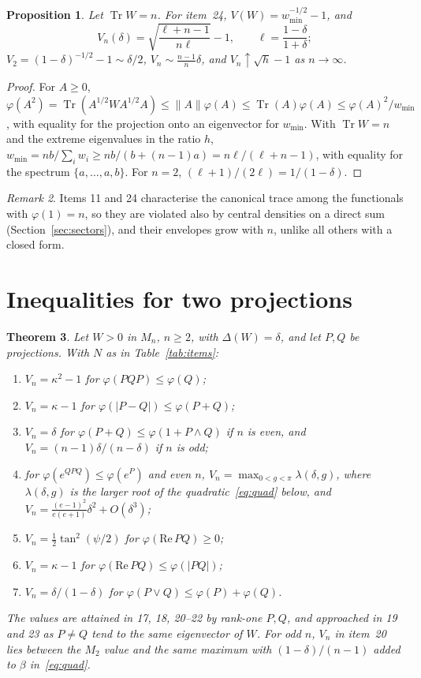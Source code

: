 \documentclass[11pt]{article}
\DeclareMathOperator{\Tr}{Tr}
\renewcommand{\Re}{\mathrm{Re}\,}
\theoremstyle{plain}
\newtheorem{theorem}{Theorem}[section]
\newtheorem{proposition}[theorem]{Proposition}
\theoremstyle{definition}
\theoremstyle{remark}
\newtheorem{remark}[theorem]{Remark}
\begin{document}
\begin{proposition}\label{prop:power}
Let $\Tr W=n$. For item~24, $V(W)=w_{\min}^{-1/2}-1$, and
\[
  V_n(\delta)=\sqrt{\frac{\ell+n-1}{n\ell}}-1,\qquad\ell=\frac{1-\delta}{1+\delta};
\]
$V_2=(1-\delta)^{-1/2}-1\sim\delta/2$, $V_n\sim\frac{n-1}n\delta$, and $V_n\uparrow\sqrt h-1$ as $n\to\infty$.
\end{proposition}
\begin{proof}
For $A\ge0$, $\varphi(A^2)=\Tr(A^{1/2}WA^{1/2}A)\le\|A\|\varphi(A)\le\Tr(A)\varphi(A)\le\varphi(A)^2/w_{\min}$, with equality for
the projection onto an eigenvector for $w_{\min}$. With $\Tr W=n$ and the extreme eigenvalues in the ratio $h$,
$w_{\min}=nb/\sum_iw_i\ge nb/(b+(n-1)a)=n\ell/(\ell+n-1)$, with equality for the spectrum $\{a,\dots,a,b\}$. For
$n=2$, $(\ell+1)/(2\ell)=1/(1-\delta)$.
\end{proof}

\begin{remark}
Items 11 and 24 characterise the canonical trace among the functionals with $\varphi(1)=n$, so they are violated also by
central densities on a direct sum (Section~\ref{sec:sectors}), and their envelopes grow with $n$, unlike all others with
a closed form.
\end{remark}

\section{Inequalities for two projections}\label{sec:proj}

\begin{theorem}\label{thm:proj}
Let $W>0$ in $M_n$, $n\ge2$, with $\Delta(W)=\delta$, and let $P,Q$ be projections. With $N$ as in
Table~\ref{tab:items}:
\begin{enumerate}
\item[(17)] $V_n=\kappa^2-1$ for $\varphi(PQP)\le\varphi(Q)$;
\item[(18)] $V_n=\kappa-1$ for $\varphi(|P-Q|)\le\varphi(P+Q)$;
\item[(19)] $V_n=\delta$ for $\varphi(P+Q)\le\varphi(1+P\wedge Q)$ if $n$ is even, and $V_n=(n-1)\delta/(n-\delta)$ if $n$
is odd;
\item[(20)] for $\varphi(e^{QPQ})\le\varphi(e^P)$ and even $n$, $V_n=\max_{0<g<\pi}\lambda(\delta,g)$, where $\lambda(\delta,g)$ is
the larger root of the quadratic~\eqref{eq:quad} below, and $V_n=\frac{(e-1)^2}{e(e+1)}\delta^2+O(\delta^3)$;
\item[(21)] $V_n=\frac12\tan^2(\psi/2)$ for $\varphi(\Re PQ)\ge0$;
\item[(22)] $V_n=\kappa-1$ for $\varphi(\Re PQ)\le\varphi(|PQ|)$;
\item[(23)] $V_n=\delta/(1-\delta)$ for $\varphi(P\vee Q)\le\varphi(P)+\varphi(Q)$.
\end{enumerate}
The values are attained in 17, 18, 20--22 by rank-one $P,Q$, and approached in 19 and 23 as $P\ne Q$ tend to the same
eigenvector of $W$. For odd $n$, $V_n$ in item~20 lies between the $M_2$ value and the same maximum with
$(1-\delta)/(n-1)$ added to $\beta$ in~\eqref{eq:quad}.
\end{theorem}
\end{document}
